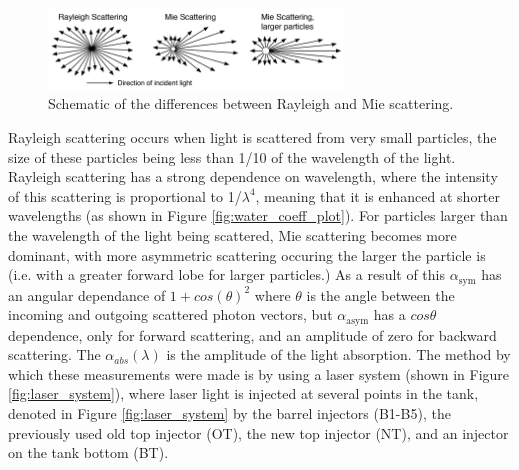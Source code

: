 \begin{figure}
    \centering
    \includegraphics[width=0.7\textwidth]{Figures/rayleigh_mie.png}
    \caption{Schematic of the differences between Rayleigh and Mie scattering.}
    \label{fig:rayleigh_mie}
\end{figure}

Rayleigh scattering occurs when light is scattered from very small particles, the size of these particles being less than 1/10 of the wavelength of the light. Rayleigh scattering has a strong dependence on wavelength, where the intensity of this scattering is proportional to 1/$\lambda^{4}$, meaning that it is enhanced at shorter wavelengths (as shown in Figure \ref{fig:water_coeff_plot}). For particles larger than the wavelength of the light being scattered, Mie scattering becomes more dominant, with more asymmetric scattering occuring the larger the particle is (i.e. with a greater forward lobe for larger particles.) As a result of this $\alpha_{\text {sym}}$ has an angular dependance of $1 + cos(\theta)^2$ where $\theta$ is the angle between the incoming and outgoing scattered photon vectors, but $\alpha_{\text {asym}}$ has a $cos\theta$ dependence, only for forward scattering, and an amplitude of zero for backward scattering. The $\alpha_{abs}(\lambda)$ is the amplitude of the light absorption. The method by which these measurements were made is by using a laser system (shown in Figure \ref{fig:laser_system}),  where laser light is injected at several points in the tank, denoted in Figure \ref{fig:laser_system} by the barrel injectors (B1-B5), the previously used old top injector (OT), the new top injector (NT), and an injector on the tank bottom (BT). 

